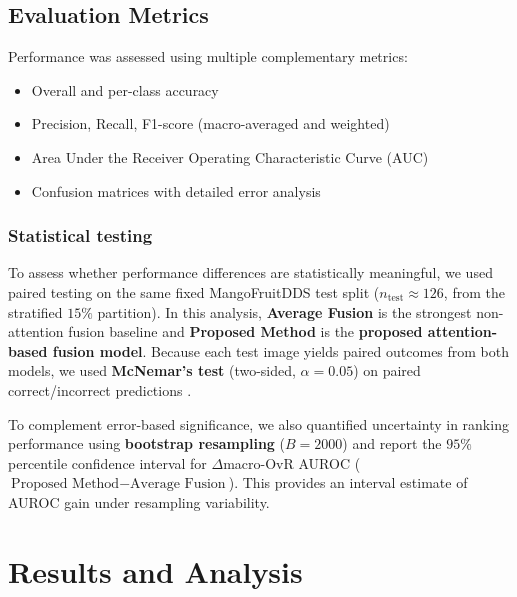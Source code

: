 \documentclass[utf8]{FrontiersinHarvard} %
\begin{document}
\subsection{Evaluation Metrics}
Performance was assessed using multiple complementary metrics:
\begin{itemize}
    \item Overall and per-class accuracy
    \item Precision, Recall, F1-score (macro-averaged and weighted)
    \item Area Under the Receiver Operating Characteristic Curve (AUC)
    \item Confusion matrices with detailed error analysis
\end{itemize}

\begingroup\color{blue}
\subsubsection{Statistical testing}
\label{sec:stat_testing}
To assess whether performance differences are statistically meaningful, we used paired testing on the same fixed MangoFruitDDS test split (\(n_{\mathrm{test}} \approx 126\), from the stratified \(15\%\) partition). In this analysis, \textbf{Average Fusion} is the strongest non-attention fusion baseline and \textbf{Proposed Method} is the \textbf{proposed attention-based fusion model}. Because each test image yields paired outcomes from both models, we used \textbf{McNemar's test} (two-sided, \(\alpha=0.05\)) on paired correct/incorrect predictions \cite{dietterich1998}.

To complement error-based significance, we also quantified uncertainty in ranking performance using \textbf{bootstrap resampling} (\(B=2000\)) and report the \(95\%\) percentile confidence interval for \(\Delta\)macro-OvR AUROC (\(\text{Proposed Method} - \text{Average Fusion}\)). This provides an interval estimate of AUROC gain under resampling variability.
\endgroup

\section{Results and Analysis}
\end{document}
